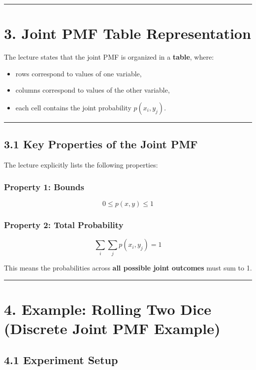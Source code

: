\documentclass[12pt]{article}
\begin{document}
\hrule
\vspace{1em}

\section*{3. Joint PMF Table Representation}

The lecture states that the joint PMF is organized in a \textbf{table}, where:

\begin{itemize}
    \item rows correspond to values of one variable,
    \item columns correspond to values of the other variable,
    \item each cell contains the joint probability \(p(x_i,y_j)\).
\end{itemize}

\hrule
\vspace{1em}

\subsection*{3.1 Key Properties of the Joint PMF}

The lecture explicitly lists the following properties:

\subsubsection*{Property 1: Bounds}

\[
0 \le p(x,y) \le 1
\]

\subsubsection*{Property 2: Total Probability}

\[
\sum_i \sum_j p(x_i,y_j)=1
\]

This means the probabilities across \textbf{all possible joint outcomes} must sum to 1.

\hrule
\vspace{1em}

\section*{4. Example: Rolling Two Dice (Discrete Joint PMF Example)}

\subsection*{4.1 Experiment Setup}
\end{document}
